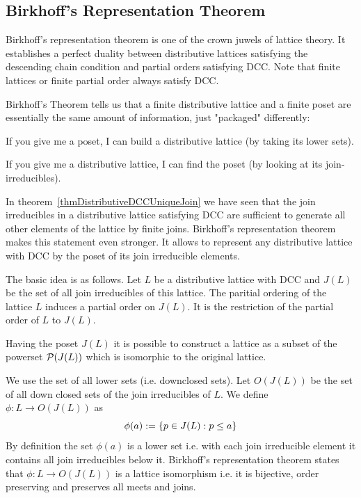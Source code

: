\subsection{Birkhoff's Representation Theorem}

Birkhoff's representation theorem is one of the crown juwels of lattice theory.
It establishes a perfect duality between distributive lattices satisfying the
descending chain condition and partial orders satisfying DCC. Note that finite
lattices or finite partial order always satisfy DCC.

Birkhoff’s Theorem tells us that a finite distributive lattice and a finite
poset are essentially the same amount of information, just "packaged"
differently:

If you give me a poset, I can build a distributive lattice (by taking its lower
sets).

If you give me a distributive lattice, I can find the poset (by looking at its
join-irreducibles).

In theorem~\ref{thmDistributiveDCCUniqueJoin} we have seen that the join
irreducibles in a distributive lattice satisfying DCC are sufficient to generate
all other elements of the lattice by finite joins. Birkhoff's representation
theorem makes this statement even stronger. It allows to represent any
distributive lattice with DCC by the poset of its join irreducible elements.

The basic idea is as follows. Let $L$ be a distributive lattice with DCC and
$J(L)$ be the set of all join irreducibles of this lattice. The paritial
ordering of the lattice $L$ induces a partial order on $J(L)$. It is the
restriction of the partial order of $L$ to $J(L)$.

Having the poset $J(L)$ it is possible to construct a lattice as a subset of the
powerset ${\mathcal P}(J(L))$ which is isomorphic to the original lattice.

We use the set of all lower sets (i.e. downclosed sets). Let $O(J(L))$ be the
set of all down closed sets of the join irreducibles of $L$. We define $\phi:
L \to O(J(L))$ as
$$
    \phi(a) := \left\{p \in J(L): p \le a\right\}
$$
By definition the set $\phi(a)$ is a lower set i.e. with each join irreducible
element it contains all join irreducibles below it. Birkhoff's representation
theorem states that $\phi: L \to O(J(L))$ is a lattice isomorphism i.e. it is
bijective, order preserving and preserves all meets and joins.





